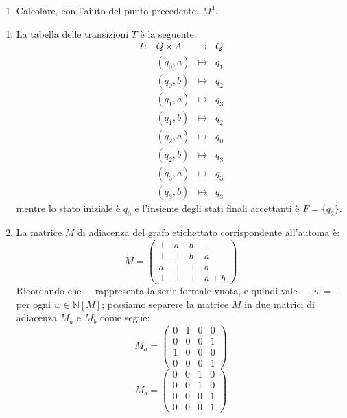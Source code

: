 \begin{ex}
\begin{enumerate}
    \item {Calcolare, con l'aiuto del punto precedente, $M^4$.}
\end{enumerate}
\begin{sol}
\begin{enumerate}
    \item La tabella delle transizioni $T$ è la seguente:
    \[
    \begin{matrix}
        T: & Q \times A & \to & Q
        \\
        &(q_0, a) & \mapsto & q_1
        \\
        &(q_0, b) & \mapsto & q_2
        \\
        &(q_1, a) & \mapsto & q_3
        \\
        &(q_1, b) & \mapsto & q_2
        \\
        &(q_2, a) & \mapsto & q_0
        \\
        &(q_2, b) & \mapsto & q_3
        \\
        &(q_3, a) & \mapsto & q_3
        \\
        &(q_3, b) & \mapsto & q_3
    \end{matrix}
    \]
    mentre lo stato iniziale è $q_0$
    e l'insieme degli stati finali accettanti è $F = \{q_2\}$.

    \item La matrice $M$ di adiacenza del grafo etichettato corrispondente all'automa è:
    \[
    M=
    \begin{pmatrix}
        \bot & a & b & \bot
        \\
        \bot & \bot & b & a
        \\
        a & \bot & \bot & b
        \\
        \bot & \bot & \bot & a + b
    \end{pmatrix}
    \]
    Ricordando che $\bot$ rappresenta la serie formale vuota, 
    e quindi vale $\bot \cdot w=\bot$ per ogni $w \in \mathbb N[M]$;
    possiamo separere la matrice $M$ in due matrici di adiacenza $M_a$ e $M_b$ come segue:
    \[
    M_a=
    \begin{pmatrix}
        0& 1 & 0 & 0
        \\
        0 & 0 & 0 & 1
        \\
        1 & 0 & 0 & 0
        \\
        0 & 0 & 0 & 1
    \end{pmatrix}
    \]
    \[
    M_b=
    \begin{pmatrix}
        0 & 0 & 1 & 0
        \\
        0 & 0 & 1 & 0
        \\
        0 & 0 & 0 & 1
        \\
        0 & 0 & 0 & 1
    \end{pmatrix}
    \]
    

\end{enumerate}
\end{sol}
\end{ex}
